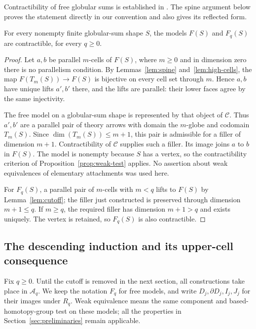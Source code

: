 Contractibility of free globular sums is established in
\cite[Proposition~3.8]{Lanari2020}.  The spine argument below proves
the statement directly in our convention and also gives its reflected form.

\begin{proposition}
\label{prop:shape-contractible}
For every nonempty finite globular-sum shape $S$, the models $F(S)$
and $F_q(S)$ are contractible, for every $q\geq0$.
\end{proposition}

\begin{proof}
Let $a,b$ be parallel $m$-cells of $F(S)$, where $m\geq0$ and in
dimension zero there is no parallelism condition.  By
Lemmas~\ref{lem:spine} and~\ref{lem:high-cells}, the map
$F(T_m(S))\to F(S)$ is bijective on every cell set through $m$.
Hence $a,b$ have unique lifts $a',b'$ there, and the lifts are
parallel: their lower faces agree by the same injectivity.

The free model on a globular-sum shape is represented by that
object of $\mathcal C$.  Thus $a',b'$ are a parallel pair of theory
arrows with domain the $m$-globe and codomain $T_m(S)$.
Since $\dim(T_m(S))\leq m+1$, this pair is admissible for a filler
of dimension $m+1$.  Contractibility of $\mathcal C$ supplies such a
filler.  Its image joins $a$ to $b$ in $F(S)$.
The model is nonempty because $S$ has a vertex, so the
contractibility criterion of Proposition~\ref{prop:weak-test}
applies.  No assertion about weak equivalences of elementary
attachments was used here.

For $F_q(S)$, a parallel pair of $m$-cells with $m<q$ lifts to
$F(S)$ by Lemma~\ref{lem:cutoff}; the filler just constructed is
preserved through dimension $m+1\leq q$.  If $m\geq q$, the
required filler has dimension $m+1>q$ and exists uniquely.  The
vertex is retained, so $F_q(S)$ is also contractible.
\end{proof}

\subsection{The descending induction and its upper-cell consequence}

Fix $q\geq0$.  Until the cutoff is removed in the next section,
all constructions take place in $\mathcal A_q$.  We keep the notation
$F_q$ for free models, and write $D_j,\partial D_j,I_j,J_j$ for
their images under $R_q$.  Weak equivalence means the same
component and based-homotopy-group test on these models; all the
properties in Section~\ref{sec:preliminaries} remain applicable.

